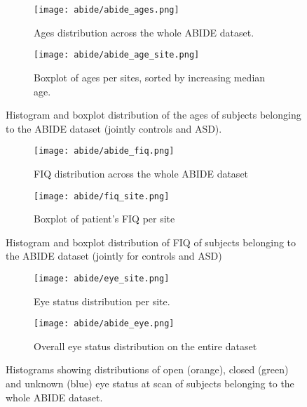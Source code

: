 \documentclass[11pt]{report}
\begin{document}
\begin{figure}
\centering
\begin{subfigure}{0.7\textwidth}
\texttt{[image: abide/abide\_ages.png]}
\caption{Ages distribution across the whole ABIDE dataset.}
\label{fig:abideages}
\end{subfigure}

\begin{subfigure}{1\textwidth}
\texttt{[image: abide/abide\_age\_site.png]}
\caption{Boxplot of ages per sites, sorted by increasing median age.}
\label{fig:abide_age_site}
\end{subfigure}
\caption{Histogram and boxplot distribution of the ages of subjects belonging to the ABIDE dataset (jointly controls and ASD).
}
 
\end{figure}






\begin{figure}
\centering
\begin{subfigure}{0.7\textwidth}
\texttt{[image: abide/abide\_fiq.png]}
\caption{FIQ distribution across the whole ABIDE dataset}
\label{fig:abidefiq}
\end{subfigure}
\begin{subfigure}{1\textwidth}
\texttt{[image: abide/fiq\_site.png]}
\caption{Boxplot of patient's FIQ per site}
\label{fig:abide_fiq_site}
\end{subfigure}
\caption{Histogram and boxplot distribution of FIQ of subjects belonging to the ABIDE dataset (jointly for controls and ASD)}
 
\end{figure}








\begin{figure}
\centering
\begin{subfigure}{1\linewidth}
\texttt{[image: abide/eye\_site.png]}
\caption{Eye status distribution per site.}
\label{fig:abideeyesite}
\end{subfigure}
\begin{subfigure}{0.7\linewidth}
\texttt{[image: abide/abide\_eye.png]}
\caption{Overall eye status distribution on the entire dataset}
\label{fig:abideeye}
\end{subfigure}
\caption{Histograms showing distributions of open (orange), closed (green) and unknown (blue) eye status at scan of subjects belonging to the whole ABIDE dataset.}
 
\end{figure}
\end{document}
